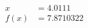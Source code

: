\documentclass[preview]{standalone}
\begin{document}
\begin{align*}
x &= 4.0111\\f(x) &= 7.8710322
\end{align*}
\end{document}
